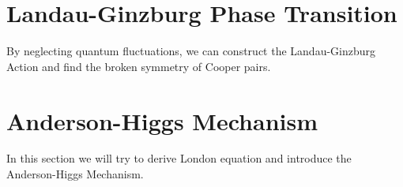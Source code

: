 \documentclass{article}
\begin{document}
\section{Landau-Ginzburg Phase Transition}
By neglecting quantum fluctuations, we can construct the Landau-Ginzburg Action and find the broken symmetry of Cooper pairs. 

\section{Anderson-Higgs Mechanism}
In this section we will try to derive London equation and introduce the Anderson-Higgs Mechanism.
\end{document}
